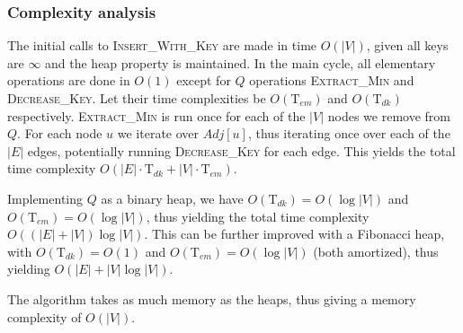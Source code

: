 \subsubsection{Complexity analysis}
The initial calls to \textsc{Insert\_With\_Key} are made in time $O(|V|)$, given all keys are $\infty$ and the heap property is maintained. In the main cycle, all elementary operations are done in $O(1)$ except for $Q$ operations \textsc{Extract\_Min} and \textsc{Decrease\_Key}. Let their time complexities be $O(\text{T}_{em})$ and $O(\text{T}_{dk})$ respectively. \textsc{Extract\_Min} is run once for each of the $|V|$ nodes we remove from $Q$. For each node $u$ we iterate over $Adj[u]$, thus iterating once over each of the $|E|$ edges, potentially running \textsc{Decrease\_Key} for each edge. This yields the total time complexity $O(|E|\cdot \text{T}_{dk}+|V|\cdot \text{T}_{em})$. \par
Implementing $Q$ as a binary heap, we have $O(\text{T}_{dk})=O(\log |V|)$ and $O(\text{T}_{em})=O(\log |V|)$, thus yielding the total time complexity $O((|E|+|V|)\log |V|)$. This can be further improved with a Fibonacci heap, with $O(\text{T}_{dk})=O(1)$ and $O(\text{T}_{em})=O(\log |V|)$ (both amortized), thus yielding $O(|E| + |V|\log |V|)$.\par
The algorithm takes as much memory as the heaps, thus giving a memory complexity of $O(|V|)$.
